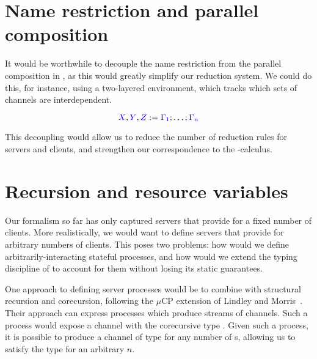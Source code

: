 \section{Name restriction and parallel composition}
It would be worthwhile to decouple the name restriction from the parallel
composition in \cp, as this would greatly simplify our reduction system.
We could do this, for instance, using a two-layered environment, which tracks
which sets of channels are interdependent.
\begin{center}
  \[
    \textcolor{blue}{X}, \textcolor{blue}{Y}, \textcolor{blue}{Z} := \textcolor{blue}{\Gamma_1} ; \dots ; \textcolor{blue}{\Gamma_n}
  \]
  \vspace*{1\baselineskip}
  \begin{prooftree*}
  \end{prooftree*}
  \begin{prooftree*}
  \end{prooftree*}
\end{center}
This decoupling would allow us to reduce the number of reduction rules for
servers and clients, and strengthen our correspondence to the \textpi-calculus.

\section{Recursion and resource variables}
Our formalism so far has only captured servers that provide for a fixed number
of clients.  More realistically, we would want to define servers that provide
for arbitrary numbers of clients.  This poses two problems: how would we define
arbitrarily-interacting stateful processes, and how would we extend the
typing discipline of \nodcap to account for them without losing its static
guarantees.

One approach to defining server processes would be to combine \nodcap with
structural recursion and corecursion, following the $\mu\text{CP}$ extension of Lindley
and Morris~\parencite{lindley2016}.  Their approach can express processes which
produce streams of  channels. Such a process would expose a channel with the
corecursive type .  Given such a process, it is
possible to produce a channel of type  for any
number of s, allowing us to satisfy the type  for an arbitrary
$n$.

